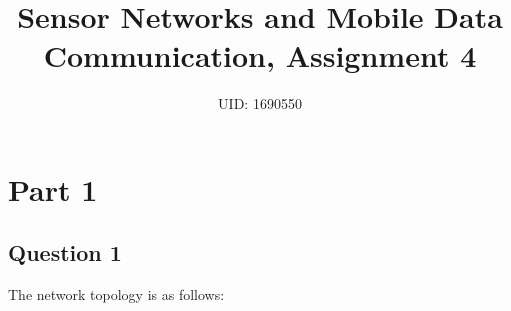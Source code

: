 \documentclass[11pt,journal]{article}
\begin{document}
	\title{Sensor Networks and Mobile Data Communication, Assignment 4}
	
	\author{UID: 1690550}%
	



	
	
	\maketitle
	
	
	
	
	\section{Part 1}
	\subsection{Question 1}
	The network topology is as follows:
	
\end{document}
